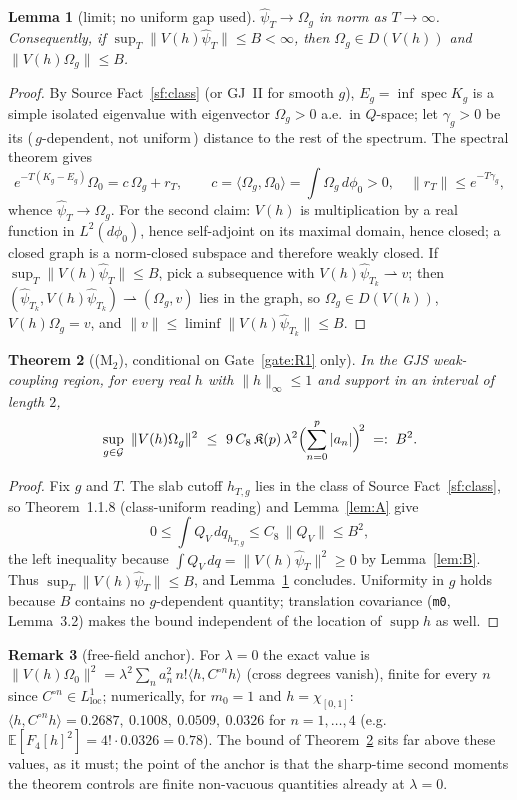 \documentclass[11pt,a4paper]{article}
\theoremstyle{plain}
\newtheorem{theorem}{Theorem}[section]
\newtheorem{lemma}[theorem]{Lemma}
\theoremstyle{definition}
\newtheorem{remark}[theorem]{Remark}
\newcommand{\Om}{\Omega}
\newcommand{\G}{\mathcal{G}}
\newcommand{\ip}[2]{\langle #1,#2\rangle}
\DeclareMathOperator{\supp}{supp}
\DeclareMathOperator{\spec}{spec}
\begin{document}
\begin{lemma}[limit; no uniform gap used]\label{lem:C}
$\hat\psi_T\to\Om_g$ in norm as $T\to\infty$. Consequently, if
$\sup_T\|V(h)\hat\psi_T\|\le B<\infty$, then $\Om_g\in D(V(h))$ and $\|V(h)\Om_g\|\le B$.
\end{lemma}

\begin{proof}
By Source Fact~\ref{sf:class} (or GJ~II for smooth $g$), $E_g=\inf\spec K_g$ is a simple isolated
eigenvalue with eigenvector $\Om_g>0$ a.e.\ in $Q$-space; let $\gamma_g>0$ be its (\,$g$-dependent,
not uniform\,) distance to the rest of the spectrum. The spectral theorem gives
\[
  e^{-T(K_g-E_g)}\Om_0=c\,\Om_g+r_T,\qquad c=\ip{\Om_g}{\Om_0}=\int\Om_g\,d\phi_0>0,\quad
  \|r_T\|\le e^{-T\gamma_g},
\]
whence $\hat\psi_T\to\Om_g$. For the second claim: $V(h)$ is multiplication by a real function in
$L^2(d\phi_0)$, hence self-adjoint on its maximal domain, hence closed; a closed graph is a norm-closed
subspace and therefore weakly closed. If $\sup_T\|V(h)\hat\psi_T\|\le B$, pick a subsequence with
$V(h)\hat\psi_{T_k}\rightharpoonup v$; then $(\hat\psi_{T_k},V(h)\hat\psi_{T_k})\rightharpoonup(\Om_g,v)$
lies in the graph, so $\Om_g\in D(V(h))$, $V(h)\Om_g=v$, and
$\|v\|\le\liminf\|V(h)\hat\psi_{T_k}\|\le B$.
\end{proof}

\begin{theorem}[(M$_2$), conditional on Gate~\ref{gate:R1} only]\label{thm:M2}
In the GJS weak-coupling region, for every real $h$ with $\|h\|_\infty\le1$ and support in an
interval of length $2$,
\[
  \sup_{g\in\G}\ \|V(h)\Om_g\|^2\ \le\ 9\,C_8\,\mathfrak K(p)\,\lambda^2
  \Bigl(\sum_{n=0}^p|a_n|\Bigr)^{\!2}\;=:\;B^2 .
\]
\end{theorem}

\begin{proof}
Fix $g$ and $T$. The slab cutoff $h_{T,g}$ lies in the class of Source Fact~\ref{sf:class}, so
Theorem~1.1.8 (class-uniform reading) and Lemma~\ref{lem:A} give
\[
  0\le\int Q_V\,dq_{h_{T,g}}\le C_8\,\|Q_V\|\le B^2 ,
\]
the left inequality because $\int Q_V\,dq=\|V(h)\hat\psi_T\|^2\ge0$ by Lemma~\ref{lem:B}. Thus
$\sup_T\|V(h)\hat\psi_T\|\le B$, and Lemma~\ref{lem:C} concludes. Uniformity in $g$ holds because
$B$ contains no $g$-dependent quantity; translation covariance (\texttt{m0}, Lemma~3.2) makes the
bound independent of the location of $\supp h$ as well.
\end{proof}

\begin{remark}[free-field anchor]
For $\lambda=0$ the exact value is
$\|V(h)\Om_0\|^2=\lambda^2\sum_n a_n^2\,n!\ip{h}{C^{\circ n}h}$ (cross degrees vanish), finite for
every $n$ since $C^{\circ n}\in L^1_{\mathrm{loc}}$; numerically, for $m_0=1$ and
$h=\chi_{[0,1]}$: $\ip{h}{C^{\circ n}h}=0.2687,\ 0.1008,\ 0.0509,\ 0.0326$ for $n=1,\dots,4$
(e.g.\ $\mathbb E[F_4[h]^2]=4!\cdot0.0326=0.78$). The bound of Theorem~\ref{thm:M2} sits far above
these values, as it must; the point of the anchor is that the sharp-time second moments the
theorem controls are finite non-vacuous quantities already at $\lambda=0$.
\end{remark}
\end{document}
